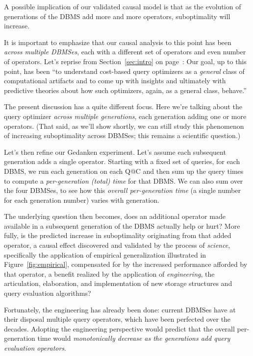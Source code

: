 \documentclass[prodmode,acmtods]{acmsmall}
\begin{document}
A possible implication of our validated causal model
is that as the evolution of generations of the \hbox{DBMS} add more and more
operators, suboptimality will increase.

It is important to emphasize that our causal analysis to this point has been
{\em across multiple \hbox{DBMSes}}, each with a different set of
operators and even number of operators. Let's reprise from Section~\ref{sec:intro} on
page~\pageref{sec:intro}: Our goal, up to this point, has been ``to \hbox{understand} cost-based query
optimizers
as a {\em general} class of computational artifacts and to come up with
insights and ultimately with predictive theories about how such optimizers,
again, as a general class, behave.''

The present discussion has a quite different focus. Here we're talking about
the query optimizer {\em across multiple
generations}, each generation adding one or more operators. (That said, as
we'll show shortly, we can still study this phenomenon of increasing
suboptimality across DBMSes; this remains a scientific question.)

Let's then refine our Gedanken experiment. Let's assume each subsequent
generation adds a single operator. Starting with a fixed set of queries,
for each DBMS, we run each generation on each Q@C and then sum up the query
times to compute a {\em per-generation (total) time} for that DBMS. We can
also sum over the four DBMSes, to see how this  {\em overall per-generation
  time} (a single number for each generation number) varies with generation.

The underlying question then becomes, does an additional operator made
available in a subsequent generation of the \hbox{DBMS} actually help or
hurt? More fully, is the predicted increase in suboptimality originating
from that added operator, a causal effect discovered and validated by the process
of {\em science}, specifically the application of \hbox{empirical} generalization illustrated
in Figure~\ref{fig:empirical}, compensated for by the increased performance
afforded by that operator, a benefit realized by the application of {\em
  engineering}, the articulation, elaboration, and implementation of new
storage structures and query evaluation algorithms?

Fortunately, the engineering has already been done: current DBMSes have at
their disposal multiple query operators, which have been perfected over the
decades. Adopting the engineering perspective would predict that the overall per-generation
time would {\em monotonically decrease as the generations add query evaluation
operators}.
\end{document}
